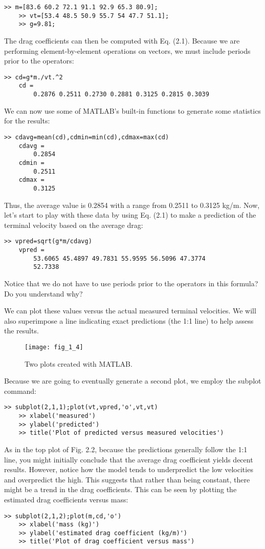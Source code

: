 \documentclass[../main.tex]{subfiles}
\begin{document}
\begin{lstlisting}[frame=none, numbers=none]
	>> m=[83.6 60.2 72.1 91.1 92.9 65.3 80.9];
	>> vt=[53.4 48.5 50.9 55.7 54 47.7 51.1];
	>> g=9.81;
\end{lstlisting}

The drag coefficients can then be computed with Eq. (2.1). Because we are performing
element-by-element operations on vectors, we must include periods prior to the operators:
\begin{lstlisting}[frame=none, numbers=none]
	>> cd=g*m./vt.^2
	cd =
		0.2876 0.2511 0.2730 0.2881 0.3125 0.2815 0.3039
\end{lstlisting}
We can now use some of MATLAB's built-in functions to generate some statistics for the
results:
\begin{lstlisting}[frame=none, numbers=none]
	>> cdavg=mean(cd),cdmin=min(cd),cdmax=max(cd)
	cdavg =
		0.2854
	cdmin =
		0.2511
	cdmax =
		0.3125
\end{lstlisting}
Thus, the average value is 0.2854 with a range from 0.2511 to 0.3125 kg/m.
Now, let's start to play with these data by using Eq. (2.1) to make a prediction of the
terminal velocity based on the average drag:
\begin{lstlisting}[frame=none, numbers=none]
	>> vpred=sqrt(g*m/cdavg)
	vpred =
		53.6065 45.4897 49.7831 55.9595 56.5096 47.3774
		52.7338
\end{lstlisting}
Notice that we do not have to use periods prior to the operators in this formula? Do you
understand why?


We can plot these values versus the actual measured terminal velocities. We will also
superimpose a line indicating exact predictions (the 1:1 line) to help assess the results.


\begin{figure}[H]
	\centering
	\texttt{[image: fig\_1\_4]}
   \caption{\textsf{Two plots created with MATLAB.}}
   \label{fig_2.2}
\end{figure}


Because we are going to eventually generate a second plot, we employ the subplot
command:
\begin{lstlisting}[frame=none, numbers=none]
	>> subplot(2,1,1);plot(vt,vpred,'o',vt,vt)
	>> xlabel('measured')
	>> ylabel('predicted')
	>> title('Plot of predicted versus measured velocities')
\end{lstlisting}


As in the top plot of Fig. 2.2, because the predictions generally follow the 1:1 line, you
might initially conclude that the average drag coefficient yields decent results. However,
notice how the model tends to underpredict the low velocities and overpredict the high.
This suggests that rather than being constant, there might be a trend in the drag coefficients.
This can be seen by plotting the estimated drag coefficients versus mass:
\begin{lstlisting}[frame=none, numbers=none]
	>> subplot(2,1,2);plot(m,cd,'o')
	>> xlabel('mass (kg)')
	>> ylabel('estimated drag coefficient (kg/m)')
	>> title('Plot of drag coefficient versus mass')
\end{lstlisting}
\end{document}
